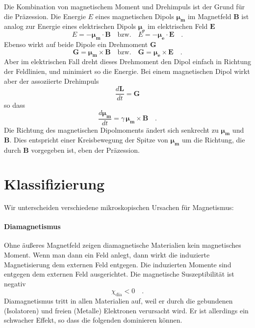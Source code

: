 Die Kombination von magnetischem Moment und Drehimpuls ist der Grund für die  Präzession. Die Energie $E$ eines magnetischen Dipols $\bm{\mu_m}$ im Magnetfeld $\bm{B}$ ist analog zur Energie eines elektrischen Dipols $\bm{\mu_e}$ im elektrischen Feld $\bm{E} $
\begin{equation}
    E = - \bm{\mu_m} \cdot \bm{B} \quad  \text{bzw.} \quad  E = - \bm{\mu_e} \cdot \bm{E}  \quad .
\end{equation}
Ebenso wirkt auf beide Dipole ein Drehmoment $\bm{G}$
\begin{equation}
    \bm{G} = \bm{\mu_m} \times \bm{B} \quad  \text{bzw.} \quad   \bm{G} = \bm{\mu_e} \times \bm{E} \quad .
\end{equation}
Aber im elektrischen Fall dreht dieses Drehmoment den Dipol einfach in Richtung der Feldlinien, und minimiert so die Energie. Bei einem magnetischen Dipol wirkt aber der assoziierte Drehimpuls
\begin{equation}
    \frac{d\bm{L}}{dt} =  \bm{G}
\end{equation}
so dass 
\begin{equation}
    \frac{d \bm{\mu_m}}{dt} = \gamma \, \bm{\mu_m} \times \bm{B} \quad .
\end{equation}
Die Richtung des magnetischen Dipolmoments ändert sich senkrecht zu $\bm{\mu_m}$ und  $\bm{B}$. Dies entspricht einer Kreisbewegung der Spitze von $\bm{\mu_m}$ um die Richtung, die durch $\bm{B}$ vorgegeben ist, eben der Präzession.

\section*{Klassifizierung}

Wir unterscheiden verschiedene mikroskopischen Ursachen für Magnetismus:

\paragraph*{Diamagnetismus} Ohne äußeres Magnetfeld zeigen diamagnetische Materialien kein magnetisches Moment. Wenn man dann ein Feld anlegt, dann wirkt die induzierte Magnetisierung dem externen Feld entgegen. Die induzierten Momente sind entgegen dem externen Feld ausgerichtet. Die magnetische Suszeptibilität ist negativ
\begin{equation}
    \chi_\text{dia} < 0 \quad .
\end{equation}
Diamagnetismus tritt in allen Materialien auf, weil er durch die gebundenen (Isolatoren) und freien (Metalle) Elektronen verursacht wird. Er ist allerdings ein schwacher Effekt, so dass die folgenden dominieren können.

